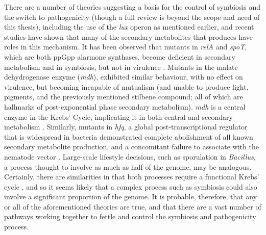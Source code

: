 There are a number of theories suggesting a basis for the control of symbiosis and the switch to pathogenicity (though a full review is beyond the scope and need of this thesis), including the use of the \emph{lux} operon as mentioned earlier, and recent studies have shown that many of the secondary metabolites that \Pa{} produces have roles in this mechanism. It has been observed that mutants in \emph{relA} and \emph{spoT}, which are both ppGpp alarmone synthases, become deficient in secondary metabolism and in symbiosis, but not in virulence \citep{Bager2016}. Mutants in the malate dehydrogenase enzyme (\emph{mdh}), exhibited similar behaviour, with no effect on virulence, but becoming incapable of mutualism (and unable to produce light, pigments, and the previously mentioned stilbene compound; all of which are hallmarks of post-exponential phase secondary metabolism). \emph{mdh} is a central enzyme in the Krebs' Cycle, implicating it in both central and secondary metabolism \citep{Lango2010}. Similarly, mutants in \emph{hfq}, a global post-transcriptional regulator that is widespread in bacteria demonstrated complete abolishment of all known secondary metabolite production, and a concomitant failure to associate with the nematode vector \citep{Tobias2016}. Large-scale lifestyle decisions, such as sporulation in \emph{Bacillus}, a process thought to involve as much as half of the genome, may be analogous. Certainly, there are similarities in that both processes require a functional Krebs' cycle \citep{Stephens1998}, and so it seems likely that a complex process such as symbiosis could also involve a significant proportion of the genome. It is probable, therefore, that any or all of the aforementioned theories are true, and that there are a vast number of pathways working together to fettle and control the symbiosis and pathogenicity process.

